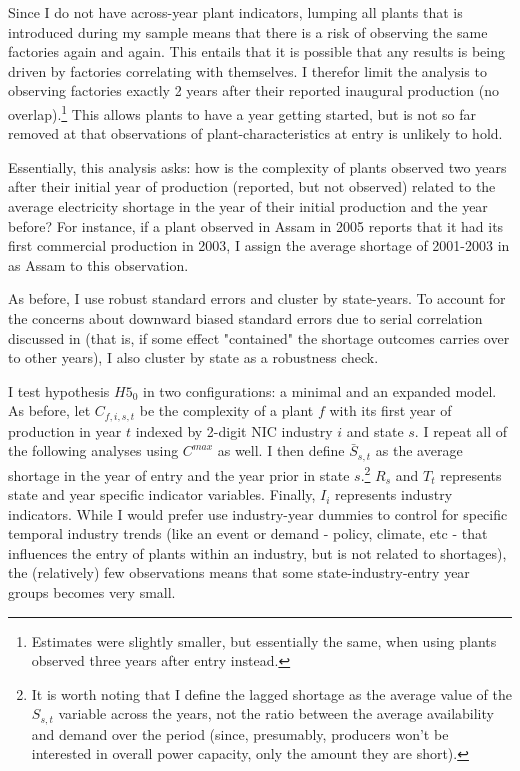 \documentclass[11pt]{article}
\begin{document}
Since I do not have across-year plant indicators, lumping all plants that is introduced during my sample means that there is a risk of observing the same factories again and again. This entails that it is possible that any results is being driven by factories correlating with themselves. I therefor limit the analysis to observing factories exactly 2 years after their reported inaugural production (no overlap).\footnote{Estimates were slightly smaller, but essentially the same, when using plants observed three years after entry instead.} This allows plants to have a year getting started, but is not so far removed at that observations of plant-characteristics at entry is unlikely to hold.

Essentially, this analysis asks: how is the complexity of plants observed two years after their initial year of production (reported, but not observed) related to the average electricity shortage in the year of their initial production and the year before? For instance, if a plant observed in Assam in 2005 reports that it had its first commercial production in 2003, I assign the average shortage of 2001-2003 in as Assam to this observation. 

As before, I use robust standard errors and cluster by state-years. To account for the concerns about downward biased standard errors due to serial correlation discussed in \cite{bertrand_how_2004} (that is, if some effect "contained" the shortage outcomes carries over to other years), I also cluster by state as a robustness check.

I test hypothesis $H5_0$ in two configurations: a minimal and an expanded model. As before, let $C_{f,i,s,t}$ be the complexity of a plant $f$ with its first year of production in year $t$ indexed by 2-digit NIC industry $i$ and state $s$. I repeat all of the following analyses using $C^{max}$ as well. I then define $\bar{S}_{s,t}$ as the average shortage in the year of entry and the year prior in state $s$.\footnote{It is worth noting that I define the lagged shortage as the average value of the $S_{s,t}$ variable across the years, not the ratio between the average availability and demand over the period (since, presumably, producers won't be interested in overall power capacity, only the amount they are short).} $R_{s}$ and $T_{t}$ represents state and year specific indicator variables. Finally, $I_{i}$ represents industry indicators. While I would prefer use industry-year dummies to control for specific temporal industry trends (like an event or demand - policy, climate, etc - that influences the entry of plants within an industry, but is not related to shortages), the (relatively) few observations means that some state-industry-entry year groups becomes very small. 
\end{document}
